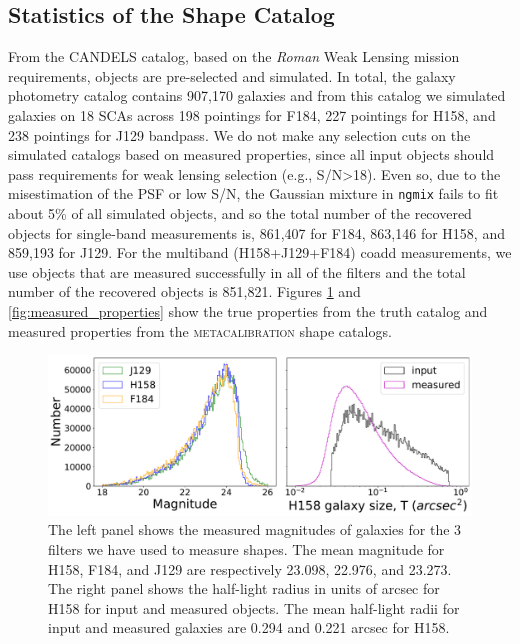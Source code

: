 \documentclass[fleqn,usenatbib]{mnras}
\begin{document}
\subsection{Statistics of the Shape Catalog}
From the CANDELS catalog, based on the \emph{Roman} Weak Lensing mission requirements, objects are pre-selected and simulated. In total, the galaxy photometry catalog contains 907,170 galaxies and from this catalog we simulated galaxies on 18 SCAs across 198 pointings for F184, 227 pointings for H158, and 238 pointings for J129 bandpass. We do not make any selection cuts on the simulated catalogs based on measured properties, since all input objects should pass requirements for weak lensing selection (e.g., S/N>18). Even so, due to the misestimation of the PSF or low S/N, the Gaussian mixture in \texttt{ngmix} fails to fit about 5\% of all simulated objects, and so the total number of the recovered objects for single-band measurements is, 861,407 for F184, 863,146 for H158, and 859,193 for J129. For the multiband (H158+J129+F184) coadd measurements, we use objects that are measured successfully in all of the filters and the total number of the recovered objects is 851,821.
Figures \ref{fig:true_properties} and \ref{fig:measured_properties} show the true properties from the truth catalog and measured properties from the \textsc{metacalibration} shape catalogs. 

\begin{figure}
	\includegraphics[width=\columnwidth]{true_properties.pdf}
	\centering
    \caption{The left panel shows the measured magnitudes of galaxies for  the 3 filters we have used to measure shapes. The mean magnitude for H158, F184, and J129 are respectively 23.098, 22.976, and 23.273. The right panel shows the half-light radius in units of arcsec for H158 for input and measured objects. The mean half-light radii for input and measured galaxies are 0.294 and 0.221 arcsec for H158.}
    \label{fig:true_properties}
\end{figure}
\end{document}

